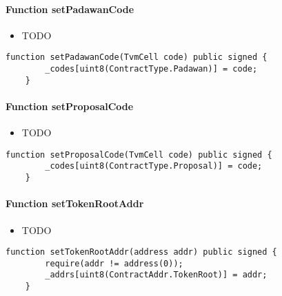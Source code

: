 \paragraph{Function setPadawanCode}

\begin{itemize}
\item TODO
\end{itemize}

\begin{lstlisting}[firstnumber=14]
    function setPadawanCode(TvmCell code) public signed {
        _codes[uint8(ContractType.Padawan)] = code;
    }
\end{lstlisting}

\paragraph{Function setProposalCode}

\begin{itemize}
\item TODO
\end{itemize}

\begin{lstlisting}[firstnumber=17]
    function setProposalCode(TvmCell code) public signed {
        _codes[uint8(ContractType.Proposal)] = code;
    }
\end{lstlisting}

\paragraph{Function setTokenRootAddr}

\begin{itemize}
\item TODO
\end{itemize}

\begin{lstlisting}[firstnumber=25]
    function setTokenRootAddr(address addr) public signed {
        require(addr != address(0));
        _addrs[uint8(ContractAddr.TokenRoot)] = addr;
    }
\end{lstlisting}
